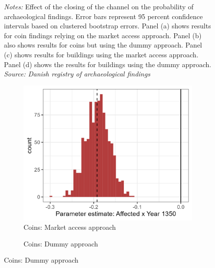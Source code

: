 \documentclass[11pt]{article}
\begin{document}
\begin{figure}
\begin{subfigure}[b]{0.45\textwidth}
    \end{subfigure}
    \parbox{0.9\textwidth}{
    \caption*{\footnotesize \textit{Notes:} Effect of the closing of the channel on the probability of archaeological findings. Error bars represent 95 percent confidence intervals based on clustered bootstrap errors. Panel (a) shows results for coin findings relying on the market access approach. Panel (b) also shows results for coins but using the dummy approach. Panel (c) shows results for buildings using the market access approach. Panel (d) shows the results for buildings using the dummy approach.  \\ \textit{Source: Danish registry of archaeological findings}}
}    \label{fig:arch_reg}
\end{figure}


\begin{figure}
    \centering
    \caption{Distribution of parameter estimates in 1350}
    \begin{subfigure}[b]{0.45\textwidth}
        \centering
        \caption{Coins: Market access approach} \label{fig:distri_a}
        \includegraphics[width=\textwidth]{Plots/Regression_plots/arch_MA_coins_boot.png}
    \end{subfigure}
    \hfill
    \begin{subfigure}[b]{0.45\textwidth}
        \centering
        \caption{Coins: Dummy approach} \label{fig:distri_b}

\end{subfigure}
\end{figure}
\end{document}
